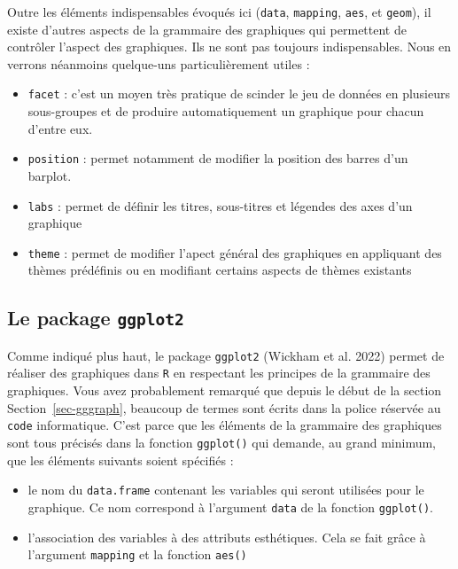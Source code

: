 \documentclass[
  letterpaper,
  DIV=11,
  numbers=noendperiod]{scrreprt}
\providecommand{\tightlist}{%
  \setlength{\itemsep}{0pt}\setlength{\parskip}{0pt}}\usepackage{longtable,booktabs,array}
\begin{document}
Outre les éléments indispensables évoqués ici (\texttt{data},
\texttt{mapping}, \texttt{aes}, et \texttt{geom}), il existe d'autres
aspects de la grammaire des graphiques qui permettent de contrôler
l'aspect des graphiques. Ils ne sont pas toujours indispensables. Nous
en verrons néanmoins quelque-uns particulièrement utiles :

\begin{itemize}
\tightlist
\item
  \texttt{facet} : c'est un moyen très pratique de scinder le jeu de
  données en plusieurs sous-groupes et de produire automatiquement un
  graphique pour chacun d'entre eux.
\item
  \texttt{position} : permet notamment de modifier la position des
  barres d'un barplot.
\item
  \texttt{labs} : permet de définir les titres, sous-titres et légendes
  des axes d'un graphique
\item
  \texttt{theme} : permet de modifier l'apect général des graphiques en
  appliquant des thèmes prédéfinis ou en modifiant certains aspects de
  thèmes existants
\end{itemize}

\hypertarget{le-package-ggplot2}{%
\subsection{\texorpdfstring{Le package
\texttt{ggplot2}}{Le package ggplot2}}\label{le-package-ggplot2}}

Comme indiqué plus haut, le package \texttt{ggplot2} (Wickham et al.
2022) permet de réaliser des graphiques dans \texttt{R} en respectant
les principes de la grammaire des graphiques. Vous avez probablement
remarqué que depuis le début de la section Section~\ref{sec-gggraph},
beaucoup de termes sont écrits dans la police réservée au \texttt{code}
informatique. C'est parce que les éléments de la grammaire des
graphiques sont tous précisés dans la fonction \texttt{ggplot()} qui
demande, au grand minimum, que les éléments suivants soient spécifiés :

\begin{itemize}
\tightlist
\item
  le nom du \texttt{data.frame} contenant les variables qui seront
  utilisées pour le graphique. Ce nom correspond à l'argument
  \texttt{data} de la fonction \texttt{ggplot()}.
\item
  l'association des variables à des attributs esthétiques. Cela se fait
  grâce à l'argument \texttt{mapping} et la fonction \texttt{aes()}
\end{itemize}
\end{document}
